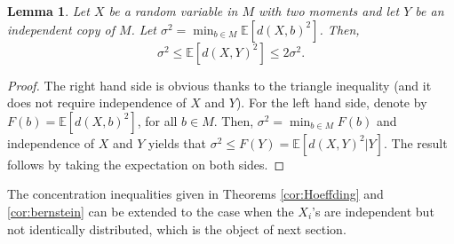 \documentclass[10pt,a4paper]{article}
\theoremstyle{plain}
\newtheorem{lemma}[theorem]{Lemma}
\theoremstyle{definition}
\theoremstyle{remark}
\newcommand{\R}{\mathbb{R}}
\newcommand{\E}{\mathbb{E}}
\begin{document}
\begin{lemma}
    Let $X$ be a random variable in $M$ with two moments and let $Y$ be an independent copy of $M$. Let $\sigma^2=\min_{b\in M}\E[d(X,b)^2]$. Then, 
$$\sigma^2\leq \E[d(X,Y)^2]\leq 2\sigma^2.$$
\end{lemma}

\begin{proof}
The right hand side is obvious thanks to the triangle inequality (and it does not require independence of $X$ and $Y$). For the left hand side, denote by $F(b)=\E[d(X,b)^2]$, for all $b\in M$. Then, $\sigma^2=\min_{b\in M} F(b)$ and independence of $X$ and $Y$ yields that $\sigma^2\leq F(Y)=\E[d(X,Y)^2|Y]$. The result follows by taking the expectation on both sides. 
\end{proof}



The concentration inequalities given in Theorems \ref{cor:Hoeffding} and \ref{cor:bernstein} can be extended to the case when the $X_i$'s are independent but not identically distributed, which is the object of next section.





\end{document}
